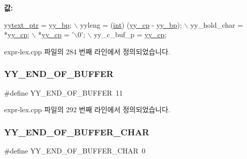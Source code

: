 {\bfseries 값\+:}
\begin{DoxyCode}
\mbox{\hyperlink{expr-lex_8cpp_a790a191a93ef4d3b8c0bb43fd7480052}{yytext\_ptr}} = \mbox{\hyperlink{expr-lex_8cpp_a71cf769ce518e8687bf8999b278c65f4}{yy\_bp}}; \(\backslash\)
        yyleng = (\mbox{\hyperlink{_util_8cpp_a0ef32aa8672df19503a49fab2d0c8071}{int}}) (\mbox{\hyperlink{expr-lex_8cpp_aebf8322d98e81db5af081bb22a5f06fe}{yy\_cp}} - \mbox{\hyperlink{expr-lex_8cpp_a71cf769ce518e8687bf8999b278c65f4}{yy\_bp}}); \(\backslash\)
        yy\_hold\_char = *\mbox{\hyperlink{expr-lex_8cpp_aebf8322d98e81db5af081bb22a5f06fe}{yy\_cp}}; \(\backslash\)
        *\mbox{\hyperlink{expr-lex_8cpp_aebf8322d98e81db5af081bb22a5f06fe}{yy\_cp}} = \textcolor{charliteral}{'\(\backslash\)0'}; \(\backslash\)
        yy\_c\_buf\_p = \mbox{\hyperlink{expr-lex_8cpp_aebf8322d98e81db5af081bb22a5f06fe}{yy\_cp}};
\end{DoxyCode}


expr-\/lex.\+cpp 파일의 284 번째 라인에서 정의되었습니다.

\mbox{\label{expr-lex_8cpp_ab2708fd42cff29ce6a0a52b91bea40d1}} 
\subsubsection{\texorpdfstring{Y\+Y\+\_\+\+E\+N\+D\+\_\+\+O\+F\+\_\+\+B\+U\+F\+F\+ER}{YY\_END\_OF\_BUFFER}}
{\footnotesize\ttfamily \#define Y\+Y\+\_\+\+E\+N\+D\+\_\+\+O\+F\+\_\+\+B\+U\+F\+F\+ER~11}



expr-\/lex.\+cpp 파일의 292 번째 라인에서 정의되었습니다.

\mbox{\label{expr-lex_8cpp_ab866a64da164ed2d4d444df1ef1fc9b3}} 
\subsubsection{\texorpdfstring{Y\+Y\+\_\+\+E\+N\+D\+\_\+\+O\+F\+\_\+\+B\+U\+F\+F\+E\+R\+\_\+\+C\+H\+AR}{YY\_END\_OF\_BUFFER\_CHAR}}
{\footnotesize\ttfamily \#define Y\+Y\+\_\+\+E\+N\+D\+\_\+\+O\+F\+\_\+\+B\+U\+F\+F\+E\+R\+\_\+\+C\+H\+AR~0}



